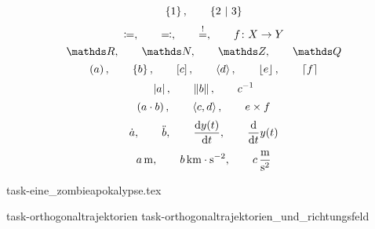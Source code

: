 \documentclass[a4paper,fleqn, 11pt]{article}
\begin{document}
  \[
    \set{1}{}
    \separate
    \set{2}{3}
  \]
  \[
    \coloneqq
    ,\qquad
    \eqqcolon
    ,\qquad
    \stackrel{!}{=}
    ,\qquad
    f\colon X\to Y
  \]
  \[
    \setReal
    \separate
    \setNatural
    \separate
    \setInteger
    \separate
    \setRational
  \]
  \[
    \left( a \right)
    ,\qquad
    \left\{ b \right\}
    ,\qquad
    \left[ c \right]
    ,\qquad
    \left\langle d \right\rangle
    ,\qquad
    \left\lfloor e \right\rfloor
    ,\qquad
    \left\lceil f \right\rceil
  \]
  \[
    \left| a \right|
    ,\qquad
    \left\| b \right\|
    ,\qquad
    {c}^{-1}
  \]
  \[
    \left( a\cdot b \right)
    ,\qquad
    \left\langle c,d \right\rangle
    ,\qquad
    e \times f
  \]
  \[
    \dot{a}
    ,\qquad
    \ddot{b}
    ,\qquad
    \frac{\mathrm{d} y(t)}{\mathrm{d} t}
    ,\qquad
    \frac{\mathrm{d} }{\mathrm{d} t}y(t)
  \]
  \[
    a\, \mathrm{m}
    ,\qquad
    b\, \mathrm{km\cdot s^{-2}}
    ,\qquad
    c\, \mathrm{\frac{m}{s^2}}
  \]

    
    
    
    
    
    
    
    
    
    
    
    
    {task-eine_zombieapokalypse.tex}
    
    
    
    {task-orthogonaltrajektorien}
    {task-orthogonaltrajektorien_und_richtungsfeld}
    
\end{document}

